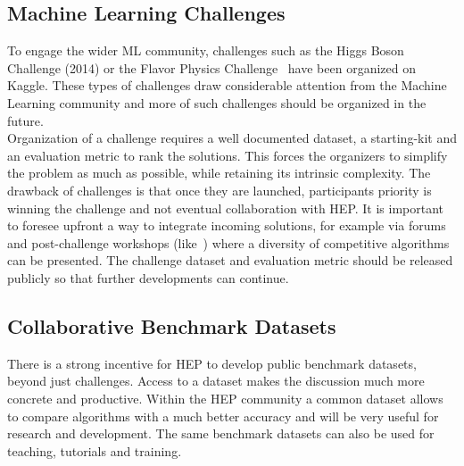 
\subsection{Machine Learning Challenges}

To engage the wider ML community, challenges such as the Higgs Boson Challenge (2014) or the Flavor Physics Challenge~\cite{NIPS:2015:ALEPH,FlavourDataMining} have been organized on Kaggle.
These types of challenges draw considerable attention from the Machine Learning community and more of such challenges should be organized in the future.\\

Organization of a challenge requires a well documented dataset, a starting-kit and an evaluation metric to rank the solutions.
This forces the organizers to simplify the problem as much as possible, while retaining its intrinsic complexity.
The drawback of challenges is that once they are launched, participants priority is winning the challenge and not eventual collaboration with HEP.
It is important to foresee upfront a way to integrate incoming solutions, for example via forums and post-challenge workshops (like~\cite{FlavourDataMining}) where a diversity of competitive algorithms can be presented.
The challenge dataset and evaluation metric should be released publicly so that further developments can continue.

\subsection{Collaborative Benchmark Datasets}\label{subsec:benchmark}
There is a strong incentive for HEP to develop public benchmark datasets, beyond just challenges. Access to a dataset makes the discussion much more concrete and productive. Within the HEP community a common dataset allows to compare algorithms with a much better accuracy and will be very useful for research and development. The same benchmark datasets can also be used for teaching, tutorials and training.\\

